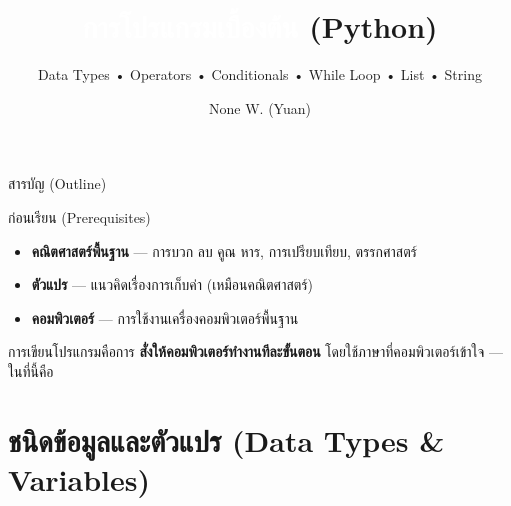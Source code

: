 \documentclass[11pt, aspectratio=169]{beamer}
\title[การโปรแกรม]{\textcolor{white}{การโปรแกรมเบื้องต้น} \textcolor{boxBlue!60}{(Python)}}
\subtitle{Data Types • Operators • Conditionals • While Loop • List • String }
\author[None W. (Yuan)]{None W. (Yuan)}
\date{}
\begin{document}
\begin{frame}[plain]\titlepage\end{frame}
\begin{frame}{สารบัญ (Outline)}\tableofcontents\end{frame}

\begin{frame}{ก่อนเรียน (Prerequisites)}
  \begin{explanation}
    \begin{itemize}
      \item \textbf{คณิตศาสตร์พื้นฐาน} — การบวก ลบ คูณ หาร, การเปรียบเทียบ, ตรรกศาสตร์
      \item \textbf{ตัวแปร} — แนวคิดเรื่องการเก็บค่า (เหมือนคณิตศาสตร์)
      \item \textbf{คอมพิวเตอร์} — การใช้งานเครื่องคอมพิวเตอร์พื้นฐาน
    \end{itemize}
  \end{explanation}
  \begin{intuition}
    การเขียนโปรแกรมคือการ \textbf{สั่งให้คอมพิวเตอร์ทำงานทีละขั้นตอน}
    โดยใช้ภาษาที่คอมพิวเตอร์เข้าใจ — ในที่นี้คือ 
  \end{intuition}
\end{frame}

\section{ชนิดข้อมูลและตัวแปร (Data Types \& Variables)}
\end{document}
